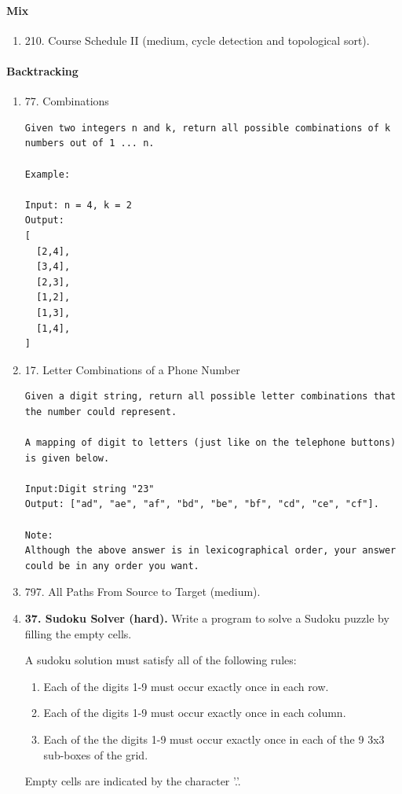 \documentclass[../main.tex]{subfiles}
\begin{document}
\paragraph{Mix}
\begin{enumerate}
    \item 210. Course Schedule II (medium, cycle detection and topological sort). 
\end{enumerate}

\paragraph{Backtracking}
\begin{enumerate}
\item 77. Combinations
\begin{lstlisting}
Given two integers n and k, return all possible combinations of k numbers out of 1 ... n.

Example:

Input: n = 4, k = 2
Output:
[
  [2,4],
  [3,4],
  [2,3],
  [1,2],
  [1,3],
  [1,4],
]
\end{lstlisting}

\item 17. Letter Combinations of a Phone Number
\begin{lstlisting}
Given a digit string, return all possible letter combinations that the number could represent.

A mapping of digit to letters (just like on the telephone buttons) is given below.

Input:Digit string "23"
Output: ["ad", "ae", "af", "bd", "be", "bf", "cd", "ce", "cf"].

Note:
Although the above answer is in lexicographical order, your answer could be in any order you want.
\end{lstlisting}

\item 797. All Paths From Source to Target (medium).

\item \textbf{37. Sudoku Solver (hard).}
Write a program to solve a Sudoku puzzle by filling the empty cells.

A sudoku solution must satisfy all of the following rules:
\begin{enumerate}
    \item Each of the digits 1-9 must occur exactly once in each row.
    \item Each of the digits 1-9 must occur exactly once in each column.
    \item Each of the the digits 1-9 must occur exactly once in each of the 9 3x3 sub-boxes of the grid.
\end{enumerate}
Empty cells are indicated by the character '.'.


\end{enumerate}
\end{document}
